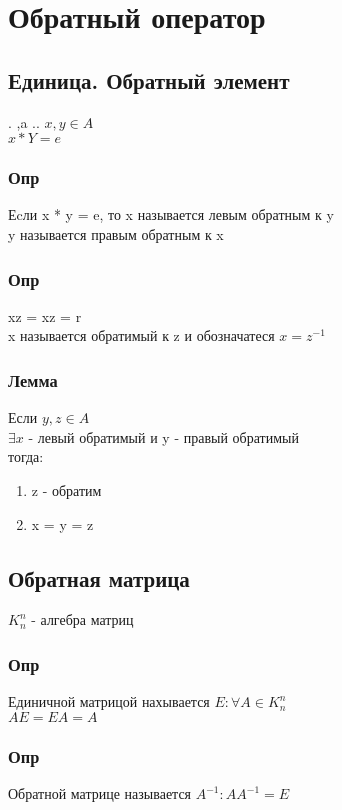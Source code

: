 \documentclass{article}
\begin{document}
\section{Обратный оператор}
\subsection{Единица. Обратный элемент}
. ,a ..
$x, y \in A$ \\
$x * Y = e$

\subsubsection{Опр}
Еcли x *  y = e, то x называется левым обратным к y \\
y называется правым обратным к x

\subsubsection{Опр}
xz = xz = r \\
x называется обратимый к z и обозначатеся $x = z^{-1}$

\subsubsection{Лемма}
Если $y, z \in A$ \\
$\exists x$  - левый обратимый и y - правый обратимый \\
тогда: \\
\begin{enumerate}
\item z - обратим
\item x = y = z
\end{enumerate}


\subsection{Обратная матрица}

$K^n_n$ - алгебра матриц
\subsubsection{Опр}
Единичной матрицой нахывается $E: \forall A \in K^n_n$ \\
$AE = EA = A$

\subsubsection{Опр}
Обратной матрице называется $A^{-1}: AA^{-1} = E$
\end{document}
